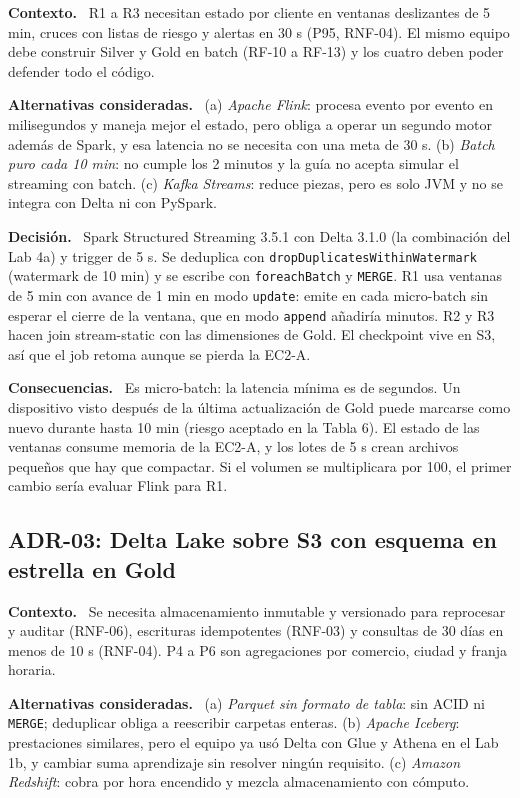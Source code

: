 \documentclass[12pt,letterpaper]{article}
\newcommand{\code}[1]{{\small\texttt{#1}}}
\newcommand{\adrpart}[1]{\textbf{#1.}~}
\begin{document}
\adrpart{Contexto} R1 a R3 necesitan estado por cliente en ventanas deslizantes de 5 min, cruces con listas de riesgo y alertas en 30 s (P95, RNF-04). El mismo equipo debe construir Silver y Gold en batch (RF-10 a RF-13) y los cuatro deben poder defender todo el código.

\adrpart{Alternativas consideradas} (a) \emph{Apache Flink}: procesa evento por evento en milisegundos y maneja mejor el estado, pero obliga a operar un segundo motor además de Spark, y esa latencia no se necesita con una meta de 30 s. (b) \emph{Batch puro cada 10 min}: no cumple los 2 minutos y la guía no acepta simular el streaming con batch. (c) \emph{Kafka Streams}: reduce piezas, pero es solo JVM y no se integra con Delta ni con PySpark.

\adrpart{Decisión} Spark Structured Streaming 3.5.1 con Delta 3.1.0 (la combinación del Lab 4a) y trigger de 5 s. Se deduplica con \code{dropDuplicatesWithinWatermark} (watermark de 10 min) y se escribe con \code{foreachBatch} y \code{MERGE}. R1 usa ventanas de 5 min con avance de 1 min en modo \code{update}: emite en cada micro-batch sin esperar el cierre de la ventana, que en modo \code{append} añadiría minutos. R2 y R3 hacen join stream-static con las dimensiones de Gold. El checkpoint vive en S3, así que el job retoma aunque se pierda la EC2-A.

\adrpart{Consecuencias} Es micro-batch: la latencia mínima es de segundos. Un dispositivo visto después de la última actualización de Gold puede marcarse como nuevo durante hasta 10 min (riesgo aceptado en la Tabla 6). El estado de las ventanas consume memoria de la EC2-A, y los lotes de 5 s crean archivos pequeños que hay que compactar. Si el volumen se multiplicara por 100, el primer cambio sería evaluar Flink para R1.

\subsection*{ADR-03: Delta Lake sobre S3 con esquema en estrella en Gold}

\adrpart{Contexto} Se necesita almacenamiento inmutable y versionado para reprocesar y auditar (RNF-06), escrituras idempotentes (RNF-03) y consultas de 30 días en menos de 10 s (RNF-04). P4 a P6 son agregaciones por comercio, ciudad y franja horaria.

\adrpart{Alternativas consideradas} (a) \emph{Parquet sin formato de tabla}: sin ACID ni \code{MERGE}; deduplicar obliga a reescribir carpetas enteras. (b) \emph{Apache Iceberg}: prestaciones similares, pero el equipo ya usó Delta con Glue y Athena en el Lab 1b, y cambiar suma aprendizaje sin resolver ningún requisito. (c) \emph{Amazon Redshift}: cobra por hora encendido y mezcla almacenamiento con cómputo.
\end{document}
